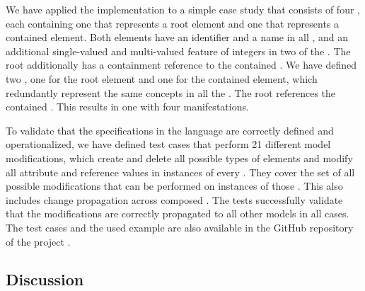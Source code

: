 We have applied the implementation to a simple case study that consists of four \metamodels, each containing one \metaclass that represents a root element and one that represents a contained element. 
Both elements have an identifier and a name in all \metamodels, and an additional single-valued and multi-valued feature of integers in two of the \metamodels.
The root \metaclass additionally has a containment reference to the contained \metaclass.
We have defined two \commonalities, one for the root element and one for the contained element, which redundantly represent the same concepts in all the \metamodels.
The root \commonality references the contained \commonality.
This results in one \conceptmetamodel with four manifestations.

To validate that the specifications in the \commonalities language are correctly defined and operationalized, we have
defined test cases that perform 21 different model modifications, which 
%
create and delete all possible types of elements and modify all attribute and reference values in instances of every \metamodel.
They cover the set of all possible modifications that can be performed on instances of those \metamodels.
This also includes change propagation across composed \commonalities.
The tests successfully validate that the modifications are correctly propagated to all other models in all cases.
The test cases and the used example \metamodels are also available in the GitHub repository of the \vitruv project \cite{vitruvFrameworkGithub}. %


\subsection{Discussion}


